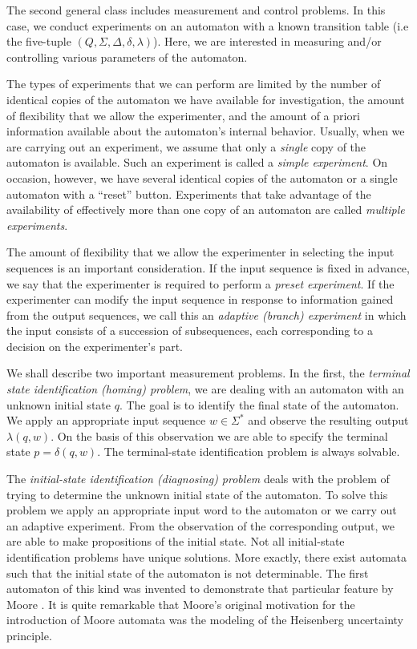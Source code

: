 The second general class includes measurement and control problems.
In this case, we conduct experiments on an automaton with a known
transition table (i.e the five-tuple $(Q,\Sigma,\Delta,\delta,\lambda)$).
Here, we are interested in measuring and/or controlling
various parameters of the automaton.

The types of experiments that we can perform are limited by the number
of identical  copies of the automaton we have available for
investigation, the amount
of flexibility that we allow the experimenter, and the amount of a priori
information available about the automaton's internal behavior.
Usually, when we are carrying out an experiment, we assume that only a
{\em single} copy of the automaton is available.
Such an experiment is called a {\em simple experiment}.
On occasion, however, we have several identical copies of the automaton or
a single automaton with a ``reset'' button.
Experiments that take advantage of the availability of effectively more than
one copy
of an automaton are called {\em multiple experiments}.

The amount of flexibility that we allow the experimenter in selecting the
input sequences is an important consideration.
If the input sequence is fixed in advance, we say that the experimenter is
required to perform a {\em preset experiment}.
If the experimenter can modify the input sequence in response to information
gained from the output sequences, we call this an
{\em adaptive (branch) experiment} in which the input consists of a succession of
subsequences, each corresponding to a decision on the experimenter's part.

We shall describe two important measurement problems.
In the first, the {\em terminal state identification (homing) problem},
we are dealing with an automaton with an unknown initial state $q$.
The goal is to identify the final state of the automaton.
We apply an appropriate input sequence $w \in \Sigma^*$ and observe the
resulting output $\lambda(q,w)$.
On the basis of this observation we are able to specify the
terminal state $p= \delta(q,w)$.
The terminal-state identification problem is always solvable.

The {\em initial-state identification (diagnosing) problem}
deals with the problem of trying to determine the unknown initial
state of the automaton.
To solve this problem we apply an appropriate input word to the automaton
or we carry out an adaptive experiment.
From the observation of the corresponding output, we are able to
make propositions of the initial state.
Not all initial-state identification problems have unique solutions.
More exactly, there exist automata such that the initial state of the
automaton is not determinable.
The first automaton of this kind was invented to demonstrate that
particular feature by Moore
\cite{moore}.
It is quite remarkable that Moore's original motivation for the
introduction of Moore automata was the modeling of the Heisenberg
uncertainty principle.


